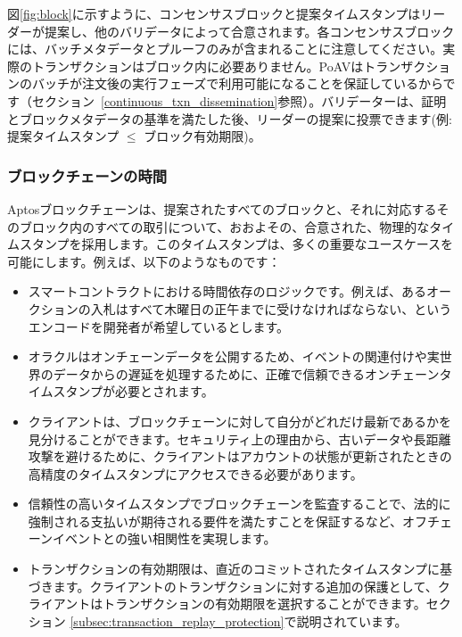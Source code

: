 \documentclass{article}
\begin{document}
図\ref{fig:block}に示すように、コンセンサスブロックと提案タイムスタンプはリーダーが提案し、他のバリデータによって合意されます。各コンセンサスブロックには、バッチメタデータとプルーフのみが含まれることに注意してください。実際のトランザクションはブロック内に必要ありません。PoAVはトランザクションのバッチが注文後の実行フェーズで利用可能になることを保証しているからです（セクション~\ref{continuous_txn_dissemination}参照）。バリデーターは、証明とブロックメタデータの基準を満たした後、リーダーの提案に投票できます(例: 提案タイムスタンプ $\le$ ブロック有効期限)。

\subsubsection{ブロックチェーンの時間}
\label{subsubsec:blockchain_time}

Aptosブロックチェーンは、提案されたすべてのブロックと、それに対応するそのブロック内のすべての取引について、おおよその、合意された、物理的なタイムスタンプを採用します。このタイムスタンプは、多くの重要なユースケースを可能にします。例えば、以下のようなものです：

\begin{itemize}
 \item スマートコントラクトにおける時間依存のロジックです。例えば、あるオークションの入札はすべて木曜日の正午までに受けなければならない、というエンコードを開発者が希望しているとします。

 \item オラクルはオンチェーンデータを公開するため、イベントの関連付けや実世界のデータからの遅延を処理するために、正確で信頼できるオンチェーンタイムスタンプが必要とされます。

 \item クライアントは、ブロックチェーンに対して自分がどれだけ最新であるかを見分けることができます。セキュリティ上の理由から、古いデータや長距離攻撃を避けるために、クライアントはアカウントの状態が更新されたときの高精度のタイムスタンプにアクセスできる必要があります。

 \item 信頼性の高いタイムスタンプでブロックチェーンを監査することで、法的に強制される支払いが期待される要件を満たすことを保証するなど、オフチェーンイベントとの強い相関性を実現します。

 \item トランザクションの有効期限は、直近のコミットされたタイムスタンプに基づきます。クライアントのトランザクションに対する追加の保護として、クライアントはトランザクションの有効期限を選択することができます。セクション \ref{subsec:transaction_replay_protection}で説明されています。

\end{itemize}
\end{document}
